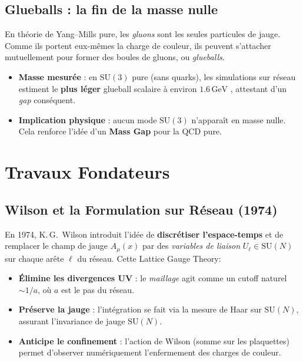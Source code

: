 \subsection*{Glueballs : la fin de la masse nulle}
En théorie de Yang--Mills pure, les \emph{gluons} sont les seules particules de jauge. Comme ils portent eux-mêmes la charge de couleur, ils peuvent s'attacher mutuellement pour former des \og boules de gluons\fg, ou \emph{glueballs}.  
\begin{itemize}
	\item \textbf{Masse mesurée} : en \(\mathrm{SU}(3)\) pure (sans quarks), les simulations sur réseau estiment le \textbf{plus léger} glueball scalaire à environ \(1.6\,\mathrm{GeV}\) \cite{Teper1998}, attestant d’un \emph{gap} conséquent.
	\item \textbf{Implication physique} : aucun mode \(\mathrm{SU}(3)\) n'apparaît en masse nulle. Cela renforce l'idée d'un \textbf{Mass Gap} pour la QCD pure.
\end{itemize}

\vspace{1em}

\section{Travaux Fondateurs}
\label{sec:2.3}

\subsection*{Wilson et la Formulation sur Réseau (1974)}
En 1974, K.\,G.~Wilson \cite{Wilson1974} introduit l’idée de \textbf{discrétiser l’espace-temps} et de remplacer le champ de jauge \(A_\mu(x)\) par des \emph{variables de liaison} \(U_\ell \in \mathrm{SU}(N)\) sur chaque arête \(\ell\) du réseau. Cette \og Lattice Gauge Theory\fg:
\begin{itemize}
	\item \textbf{Élimine les divergences UV} : le \emph{maillage} agit comme un cutoff naturel \(\sim 1/a\), où \(a\) est le pas du réseau.
	\item \textbf{Préserve la jauge} : l’intégration se fait via la mesure de Haar sur \(\mathrm{SU}(N)\), assurant l’invariance de jauge \(\mathrm{SU}(N)\).
	\item \textbf{Anticipe le confinement} : l’action de Wilson (somme sur les \og plaquettes\fg) permet d'observer numériquement l’enfermement des charges de couleur.
\end{itemize}


